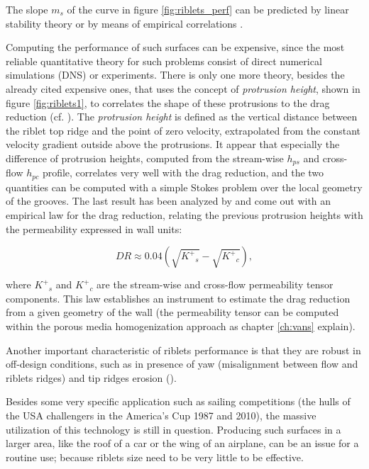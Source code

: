 The slope $m_s$ of the curve in figure \ref{fig:riblets_perf} can be predicted by linear stability theory or by means of empirical correlations \citet{garcia2011hydrodynamic}.

Computing the performance of such surfaces can be expensive, since the most reliable quantitative theory for such problems consist of direct numerical simulations (DNS) or experiments.
There is only one more theory, besides the already cited expensive ones, that uses the concept of \textit{protrusion height}, shown in figure \ref{fig:riblets1}, to correlates the shape of these protrusions to the drag reduction (cf. \citet{luchini1991resistance}).
The \textit{protrusion height} is defined as the vertical distance between the riblet top ridge and the point of zero velocity, extrapolated from the constant velocity gradient outside above the protrusions.
It appear that especially the difference of protrusion heights, computed from the stream-wise $h_{ps}$ and cross-flow $h_{pc}$ profile, correlates very well with the drag reduction, and the two quantities can be computed with a simple Stokes problem over the local geometry of the grooves.
The last result has been analyzed by \citet{segura2017permeable} and come out with an empirical law for the drag reduction, relating the previous protrusion heights with the permeability expressed in wall units:

\begin{equation}
DR \approx 0.04\left( \sqrt{{K^+}_s} - \sqrt{{K^+}_c} \right),
\label{eq:max_dr}
\end{equation}

where ${K^+}_s$ and ${K^+}_c$ are the stream-wise and cross-flow permeability tensor components.
This law establishes an instrument to estimate the drag reduction from a given geometry of the wall (the permeability tensor can be computed within the porous media homogenization approach as chapter \ref{ch:vans} explain).

Another important characteristic of riblets performance is that they are robust in off-design conditions, such as in presence of yaw (misalignment between flow and riblets ridges) and tip ridges erosion (\citet{garcia2011drag}).

Besides some very specific application such as sailing competitions (the hulls of the USA challengers in the America’s Cup 1987 and 2010), the massive utilization of this technology is still in question.
Producing such surfaces in a larger area, like the roof of a car or the wing of an airplane, can be an issue for a routine use; because riblets size need to be very little to be effective.

